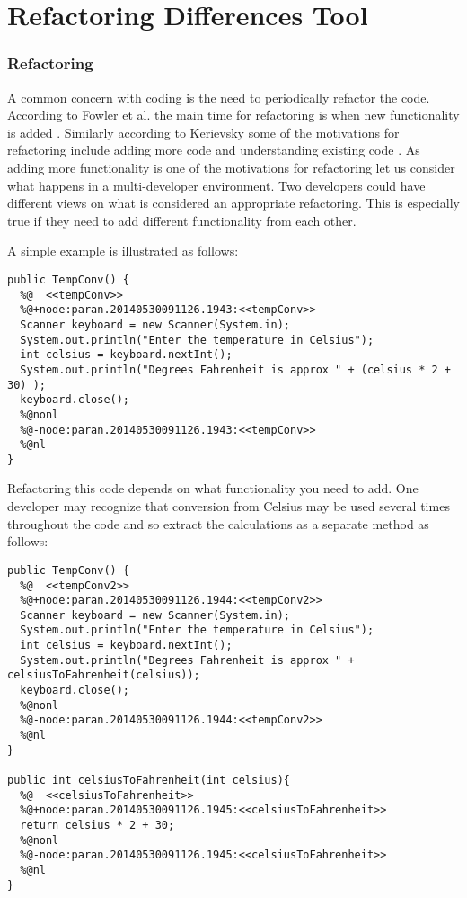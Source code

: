 

\chapter{Refactoring Differences Tool}


\subsection{Refactoring}
A common concern with coding is the need to periodically refactor the code. According to Fowler et al. the main time for refactoring is when new functionality is added \cite{Fowler1999}. Similarly according to Kerievsky some of the motivations for refactoring include adding more code and understanding existing code \cite{Kerievsky2004}. As adding more functionality is one of the motivations for refactoring let us consider what happens in a multi-developer environment. Two developers could have different views on what is considered an appropriate refactoring. This is especially true if they need to add different functionality from each other. 

A simple example is illustrated as follows:
\begin{verbatim}
public TempConv() {
  %@  <<tempConv>>
  %@+node:paran.20140530091126.1943:<<tempConv>>
  Scanner keyboard = new Scanner(System.in);
  System.out.println("Enter the temperature in Celsius");
  int celsius = keyboard.nextInt();
  System.out.println("Degrees Fahrenheit is approx " + (celsius * 2 + 30) );
  keyboard.close();
  %@nonl
  %@-node:paran.20140530091126.1943:<<tempConv>>
  %@nl
}
\end{verbatim}

Refactoring this code depends on what functionality you need to add. One developer may recognize that conversion from Celsius may be used several times throughout the code and so extract the calculations as a separate method as follows:

\begin{verbatim}
public TempConv() {
  %@  <<tempConv2>>
  %@+node:paran.20140530091126.1944:<<tempConv2>>
  Scanner keyboard = new Scanner(System.in);
  System.out.println("Enter the temperature in Celsius");
  int celsius = keyboard.nextInt();
  System.out.println("Degrees Fahrenheit is approx " + celsiusToFahrenheit(celsius));
  keyboard.close();
  %@nonl
  %@-node:paran.20140530091126.1944:<<tempConv2>>
  %@nl
}

public int celsiusToFahrenheit(int celsius){
  %@  <<celsiusToFahrenheit>>
  %@+node:paran.20140530091126.1945:<<celsiusToFahrenheit>>
  return celsius * 2 + 30;
  %@nonl
  %@-node:paran.20140530091126.1945:<<celsiusToFahrenheit>>
  %@nl
}
\end{verbatim}

